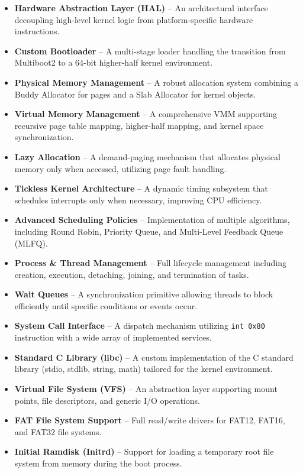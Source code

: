 \documentclass[a4paper,10pt,twoside]{report}
\theoremstyle{definition}
\begin{document}
\begin{itemize} 
    \item \textbf{Hardware Abstraction Layer (HAL)} -- An architectural interface decoupling high-level kernel logic from platform-specific hardware instructions.
    \item \textbf{Custom Bootloader} -- A multi-stage loader handling the transition from Multiboot2 to a 64-bit higher-half kernel environment.
    \item \textbf{Physical Memory Management} -- A robust allocation system combining a Buddy Allocator for pages and a Slab Allocator for kernel objects.
    \item \textbf{Virtual Memory Management} -- A comprehensive VMM supporting recursive page table mapping, higher-half mapping, and kernel space synchronization.
    \item \textbf{Lazy Allocation} -- A demand-paging mechanism that allocates physical memory only when accessed, utilizing page fault handling.
    \item \textbf{Tickless Kernel Architecture} -- A dynamic timing subsystem that schedules interrupts only when necessary, improving CPU efficiency.
    \item \textbf{Advanced Scheduling Policies} -- Implementation of multiple algorithms, including Round Robin, Priority Queue, and Multi-Level Feedback Queue (MLFQ).
    \item \textbf{Process \& Thread Management} -- Full lifecycle management including creation, execution, detaching, joining, and termination of tasks.
    \item \textbf{Wait Queues} -- A synchronization primitive allowing threads to block efficiently until specific conditions or events occur.
    \item \textbf{System Call Interface} -- A dispatch mechanism utilizing \texttt{int 0x80} instruction with a wide array of implemented services.
    \item \textbf{Standard C Library (libc)} -- A custom implementation of the C standard library (stdio, stdlib, string, math) tailored for the kernel environment.
    \item \textbf{Virtual File System (VFS)} -- An abstraction layer supporting mount points, file descriptors, and generic I/O operations.
    \item \textbf{FAT File System Support} -- Full read/write drivers for FAT12, FAT16, and FAT32 file systems.
    \item \textbf{Initial Ramdisk (Initrd)} -- Support for loading a temporary root file system from memory during the boot process.

\end{itemize}
\end{document}
